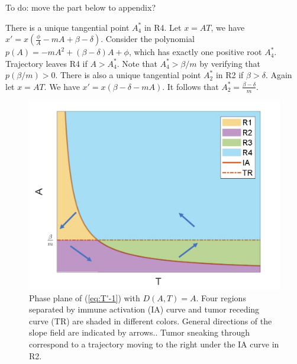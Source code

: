 \documentclass[review,authoryear]{elsarticle}
\begin{document}
To do: move the part below to appendix? 

There is a unique tangential point $A_{4}^{*}$ in R4. Let $x=AT$,
we have $x'=x(\frac{\phi}{A}-mA+\beta-\delta)$. Consider the polynomial
$p(A)=-mA^{2}+(\beta-\delta)A+\phi$, which has exactly one positive
root $A_{4}^{*}$. Trajectory leaves R4 if $A>A_{4}^{*}$. Note that
$A_{4}^{*}>\beta/m$ by verifying that $p(\beta/m)>0$. There is also
a unique tangential point $A_{2}^{*}$ in R2 if $\beta>\delta$. Again
let $x=AT$. We have $x'=x(\beta-\delta-mA)$. It follows that $A_{2}^{*}=\frac{\beta-\delta}{m}$. 

\begin{figure}
\centerline{\includegraphics[width=0.8\linewidth]{figs/DA-PP-4regions}}

\caption{Phase plane of (\ref{eq:T'-1}) with $D(A,T)=A$. Four regions separated
by immune activation (IA) curve and tumor receding curve (TR) are
shaded in different colors. General directions of the slope field
are indicated by arrows.\label{fig:DA-PP-4regions}. Tumor sneaking
through correspond to a trajectory moving to the right under the IA
curve in R2. }
\end{figure}
\end{document}
